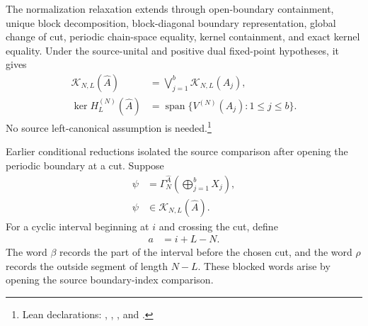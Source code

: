 \documentclass{article}
\begin{document}
The normalization relaxation extends through open-boundary containment, unique
block decomposition, block-diagonal boundary representation, global change of
cut, periodic chain-space equality, kernel containment, and exact kernel
equality. Under the source-unital and positive dual fixed-point hypotheses, it
gives
\begin{align}
  \mathcal K_{N,L}(\widehat A)
    &=
    \bigvee_{j=1}^b\mathcal K_{N,L}(A_j),
  \label{eq:cpgsv21_block_diagonal_parent_ground_space_chain_decomposition}\\
  \ker H_L^{(N)}(\widehat A)
    &=
    \operatorname{span}
    \{V^{(N)}(A_j):1\leq j\leq b\}.
  \label{eq:cpgsv21_block_diagonal_parent_ground_space_kernel_span}
\end{align}
No source left-canonical assumption is needed.\footnote{Lean declarations:
,
,
,
and
.}

Earlier conditional reductions isolated the source comparison after opening the
periodic boundary at a cut. Suppose
\begin{align}
  \psi
    &=
    \Gamma_N^{\widehat A}
    \left(\bigoplus_{j=1}^bX_j\right),
  \label{eq:cpgsv21_block_diagonal_parent_ground_space_boundary_representation}\\
  \psi
    &\in
    \mathcal K_{N,L}(\widehat A).
  \label{eq:cpgsv21_block_diagonal_parent_ground_space_boundary_state}
\end{align}
For a cyclic interval beginning at $i$ and crossing the cut, define
\begin{align}
  a
    &=
    i+L-N.
  \label{eq:cpgsv21_block_diagonal_parent_ground_space_wrapped_length}
\end{align}
The word $\beta$ records the part of the interval before the chosen cut, and
the word $\rho$ records the outside segment of length $N-L$. These blocked
words arise by opening the source boundary-index comparison.
\end{document}

